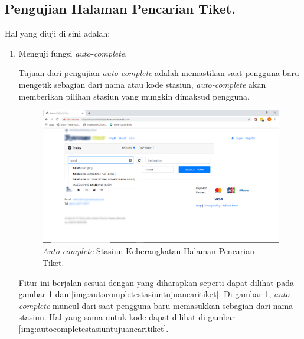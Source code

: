 \subsection{Pengujian Halaman Pencarian Tiket.}
\label{subsec:pengujiancaritiket}
    Hal yang diuji di sini adalah:
    \begin{enumerate}
        \item Menguji fungsi \textit{auto-complete}.
        
        Tujuan dari pengujian \textit{auto-complete} adalah memastikan saat pengguna baru mengetik sebagian dari nama atau kode stasiun, \textit{auto-complete} akan memberikan pilihan stasiun yang mungkin dimaksud pengguna.
        
        \begin{figure}[H]
        \center
        \includegraphics[width=\textwidth,height=\textheight,keepaspectratio]{Gambar/Auto-complete Origin Halaman Pencarian Tiket.png}
        \caption{\textit{Auto-complete} Stasiun Keberangkatan Halaman Pencarian Tiket.}
            \label{img:autocompletestasiunasalcaritiket}
        \end{figure}
        
        Fitur ini berjalan sesuai dengan yang diharapkan seperti dapat dilihat pada gambar \ref{img:autocompletestasiunasalcaritiket} dan \ref{img:autocompletestasiuntujuancaritiket}. Di gambar \ref{img:autocompletestasiunasalcaritiket}, \textit{auto-complete} muncul dari saat pengguna baru memasukkan sebagian dari nama stasiun. Hal yang sama untuk kode dapat dilihat di gambar \ref{img:autocompletestasiuntujuancaritiket}.
        

\end{enumerate}
